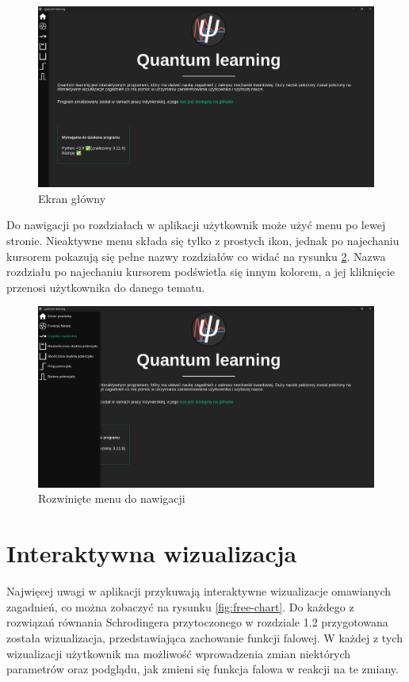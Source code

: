 \documentclass{SGGW-thesis}
\begin{document}
	\begin{figure}[H]
	\includegraphics[width=\textwidth,height=\textheight,keepaspectratio]{main page.png} 
	\caption{Ekran główny}
	\label{fig:main-page}
	\end{figure}
	
	Do nawigacji po rozdziałach w aplikacji użytkownik może użyć menu po lewej stronie. Nieaktywne menu składa się tylko z prostych ikon, jednak po najechaniu kursorem pokazują się pełne nazwy rozdziałów co widać na rysunku \ref{fig:menu-unfolded}. Nazwa rozdziału po najechaniu kursorem podświetla się innym kolorem, a jej kliknięcie przenosi użytkownika do danego tematu.
	
	\begin{figure}[H]
	\includegraphics[width=\textwidth,height=\textheight,keepaspectratio]{menu unfolded.png} 
	\caption{Rozwinięte menu do nawigacji}
	\label{fig:menu-unfolded}
	\end{figure}
	
	\section{Interaktywna wizualizacja}
	Najwięcej uwagi w aplikacji przykuwają interaktywne wizualizacje omawianych zagadnień, co można zobaczyć na rysunku \ref{fig:free-chart}. Do każdego z rozwiązań równania Schrodingera przytoczonego w rozdziale 1.2 przygotowana została wizualizacja, przedstawiająca zachowanie funkcji falowej. W każdej z tych wizualizacji użytkownik ma możliwość wprowadzenia zmian niektórych parametrów oraz podglądu, jak zmieni się funkcja falowa w reakcji na te zmiany.
	
\end{document}
